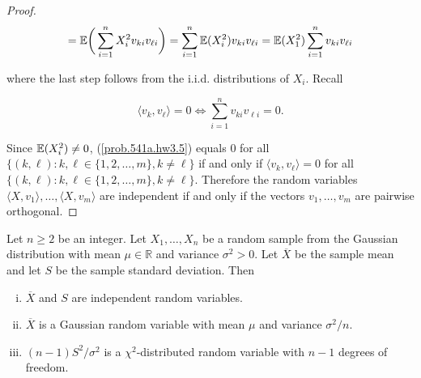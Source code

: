 \begin{proof}
 \begin{equation}\label{prob.541a.hw3.5}
= \E \bigg(  \sum_{i=1}^n X_i^2 v_{ki} v_{\ell i} \bigg) = \sum_{i=1}^n  \E (X_i^2 ) v_{ki} v_{\ell i}  = \E (X_1^2 ) \sum_{i=1}^n   v_{ki} v_{\ell i} 
\end{equation}

where the last step follows from the i.i.d. distributions of \(X_i\). Recall

\[
\langle v_k, v_\ell \rangle = 0 \iff  \sum_{i=1}^n   v_{ki} v_{\ell i}  = 0.
\]

Since \(\E(X_i^2) \neq 0\), (\ref{prob.541a.hw3.5}) equals 0 for all \( \{(k, \ell) : k, \ell \in \{1, 2, \ldots, m\}, k \neq \ell \}\) if and only if \(\langle v_k, v_\ell \rangle = 0 \) for all \( \{(k, \ell) : k, \ell \in \{1, 2, \ldots, m\}, k \neq \ell \}\). Therefore the random variables $\langle X, v_1 \rangle, \dots, \langle X, v_m \rangle$ are independent if and only if the vectors $v_1,\dots,v_m$ are pairwise orthogonal.

\end{proof}

\begin{proposition}\label{mathstats.dist.sampl.var} Let \(n \geq 2\) be an integer. Let \(X_1, \ldots, X_n\) be a random sample from the Gaussian distribution with mean \(\mu \in \mathbb{R}\) and variance \(\sigma^2 > 0\). Let \(\overline{X}\) be the sample mean and let \(S\) be the sample standard deviation. Then

\begin{enumerate}[(i)]

\item \(\overline{X}\) and \(S\) are independent random variables.

\item \(\overline{X}\) is a Gaussian random variable with mean \(\mu\) and variance \(\sigma^2/n\).

\item \((n-1)S^2/\sigma^2\) is a \(\chi^2\)-distributed random variable with \(n-1\) degrees of freedom.

\end{enumerate}

\end{proposition}

